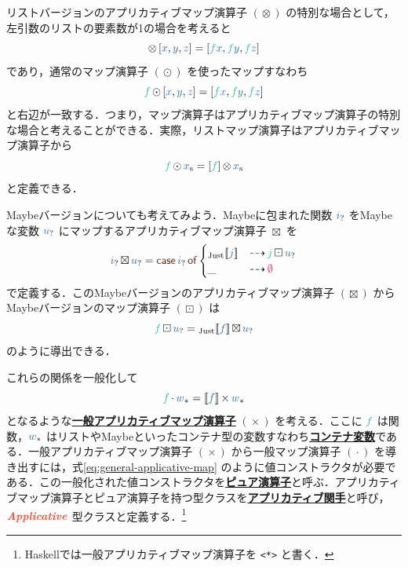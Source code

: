 \documentclass[a5paper,twoside,fleqn,draft]{jsbook}
\def\[{[\![}
\def\]{]\!]}
\def\constantColor{WildStrawberry}
\def\keywordColor{Sepia}
\def\varColor{NavyBlue}
\def\funcColor{BlueGreen}
\def\typeColor{RedOrange}
\newcommand{\programminglanguage}[1]{\textsf{#1}}
\newcommand{\haskell}{\programminglanguage{Haskell}}
\newcommand{\keyword}[1]{{\underline{\textbf{#1}}}}
\newcommand{\code}[1]{\texttt{#1}}
\newcommand{\mKeyword}[1]{\textcolor{\keywordColor}{\mathsf{#1}}}
\newcommand{\mIfKeyword}{\mKeyword{if}}
\newcommand{\mCaseKeyword}{\mKeyword{case}}
\newcommand{\mOfKeyword}{\mKeyword{of}}
\newcommand{\mOtherwiseKeyword}{\mKeyword{otherwise}}
\DeclareMathOperator{\mCaseKW}{\mCaseKeyword}
\DeclareMathOperator{\mIf}{\mIfKeyword}
\DeclareMathOperator{\mOfKW}{\mOfKeyword}
\DeclareMathOperator{\mOtherwise}{\mOtherwiseKeyword}
\newcommand{\mNothing}{\textcolor{\constantColor}{\emptyset}}
\newcommand{\mVar}[1]{\textcolor{\varColor}{#1}}
\newcommand{\mXVar}{\mVar{x}}
\newcommand{\mYVar}{\mVar{y}}
\newcommand{\mZVar}{\mVar{z}}
\newcommand{\mFunc}[1]{\textcolor{\funcColor}{#1}}
\newcommand{\mFFunc}{{\mFunc{f}}}
\newcommand{\mJFunc}{\mFunc{j}}
\DeclareMathOperator{\mAppMap}{\times}
\DeclareMathOperator{\mAppMapList}{\otimes}
\DeclareMathOperator{\mAppMapMaybe}{\boxtimes}
\DeclareMathOperator{\mIfSo}{\dashrightarrow}
\DeclareMathOperator{\mLogicalAnd}{\wedge}
\DeclareMathOperator{\mMap}{\cdot}
\DeclareMathOperator{\mMapList}{\odot}
\DeclareMathOperator{\mMapMaybe}{\boxdot}
\newcommand{\mValueConstructor}[1]{\mathrm{#1}}
\newcommand{\mValueWith}[2]{{}_\mValueConstructor{#1}\[\mVar{#2}\]}
\newcommand{\mJustWith}[1]{\mValueWith{Just}{#1}}
\newcommand{\mPureWith}[1]{\[\mVar{#1}\]}
\newcommand{\mTypeClass}[1]{\textcolor{\typeColor}{\textbf{\textit{#1}}}}
\newcommand{\mApplicativeTypeClass}{\mTypeClass{Applicative}}
\newcommand{\mList}[1]{\mVar{#1}_\mathrm{s}}
\newcommand{\mMaybe}[1]{\mVar{#1}_?}
\newcommand{\mVarContainer}[1]{\mVar{#1}_*}
\newcommand{\mCaseOf}[1]{\mCaseKW#1\mOfKW}
\begin{document}
リストバージョンのアプリカティブマップ演算子 $(\mAppMapList)$ の特別な場合として，左引数のリストの要素数が1の場合を考えると
\begin{equation}
  [\mFFunc]\mAppMapList{}[\mXVar,\mYVar,\mZVar]
  =[\mFFunc\mXVar,\mFFunc\mYVar,\mFFunc\mZVar]
\end{equation}
であり，通常のマップ演算子 $(\mMapList)$ を使ったマップすなわち
\begin{equation}
  \mFFunc\mMapList{}[\mXVar,\mYVar,\mZVar]
  =[\mFFunc\mXVar,\mFFunc\mYVar,\mFFunc\mZVar]
\end{equation}
と右辺が一致する．つまり，マップ演算子はアプリカティブマップ演算子の特別な場合と考えることができる．実際，リストマップ演算子はアプリカティブマップ演算子から
\begin{equation}
  \mFFunc\mMapList\mList{x}
  =[\mFFunc]\mAppMapList\mList{x}
\end{equation}
と定義できる．

Maybeバージョンについても考えてみよう．Maybeに包まれた関数 $\mMaybe{i}$ をMaybeな変数 $\mMaybe{u}$ にマップするアプリカティブマップ演算子
$\mAppMapMaybe$ を
\begin{equation}
  \mMaybe{i}\mAppMapMaybe\mMaybe{u}
  =\mCaseOf{\mMaybe{i}}
  \begin{cases}
    \mJustWith{j}
    &\mIfSo\mJFunc\mMapMaybe\mMaybe{u}\\
    \_
    &\mIfSo\mNothing
  \end{cases}
\end{equation}
で定義する．このMaybeバージョンのアプリカティブマップ演算子 $(\mAppMapMaybe)$ からMaybeバージョンのマップ演算子 $(\mMapMaybe)$ は
\begin{equation}
  \mFFunc\mMapMaybe\mMaybe{u}
  =\mJustWith{f}\mAppMapMaybe\mMaybe{u}
\end{equation}
のように導出できる．

これらの関係を一般化して
\begin{equation}
  \label{eq:general-applicative-map}
  \mFFunc\mMap\mVarContainer{w}
  =\mPureWith{f}\mAppMap\mVarContainer{w}
\end{equation}
となるような\keyword{一般アプリカティブマップ演算子} $(\mAppMap)$ を考える．ここに $\mFFunc$ は関数，$\mVarContainer{w}$ はリストやMaybeといったコンテナ型の変数すなわち\keyword{コンテナ変数}である．一般アプリカティブマップ演算子 $(\mAppMap)$ から一般マップ演算子 $(\mMap)$ を導き出すには，式\eqref{eq:general-applicative-map} のように値コンストラクタが必要である．この一般化された値コンストラクタを\keyword{ピュア演算子}と呼ぶ．アプリカティブマップ演算子とピュア演算子を持つ型クラスを\keyword{アプリカティブ関手}と呼び，$\mApplicativeTypeClass$ 型クラスと定義する．\footnote{\haskell では一般アプリカティブマップ演算子を \code{<*>} と書く．}
\end{document}
